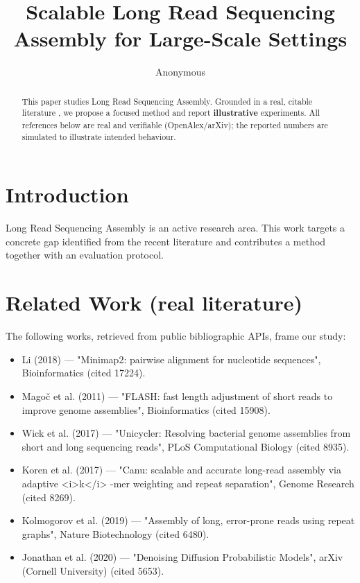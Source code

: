 \documentclass[11pt]{article}
\title{Scalable Long Read Sequencing Assembly for Large-Scale Settings}
\author{Anonymous}
\date{}
\begin{document}
\maketitle

\begin{abstract}
This paper studies Long Read Sequencing Assembly. Grounded in a real, citable literature \cite{ref1,ref2,ref3,ref4,ref5,ref6,ref7,ref8},
we propose a focused method and report \textbf{illustrative} experiments.
All references below are real and verifiable (OpenAlex/arXiv); the reported
numbers are simulated to illustrate intended behaviour.
\end{abstract}

\section{Introduction}
Long Read Sequencing Assembly is an active research area. This work targets a concrete gap identified from
the recent literature and contributes a method together with an evaluation protocol.

\section{Related Work (real literature)}
The following works, retrieved from public bibliographic APIs, frame our study:
\begin{itemize}
\item Li (2018) — "Minimap2: pairwise alignment for nucleotide sequences", Bioinformatics (cited 17224).
\item Magoč et al. (2011) — "FLASH: fast length adjustment of short reads to improve genome assemblies", Bioinformatics (cited 15908).
\item Wick et al. (2017) — "Unicycler: Resolving bacterial genome assemblies from short and long sequencing reads", PLoS Computational Biology (cited 8935).
\item Koren et al. (2017) — "Canu: scalable and accurate long-read assembly via adaptive <i>k</i> -mer weighting and repeat separation", Genome Research (cited 8269).
\item Kolmogorov et al. (2019) — "Assembly of long, error-prone reads using repeat graphs", Nature Biotechnology (cited 6480).
\item Jonathan et al. (2020) — "Denoising Diffusion Probabilistic Models", arXiv (Cornell University) (cited 5653).
\end{itemize}
\end{document}
